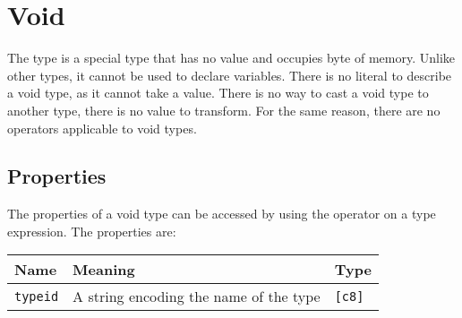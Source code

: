 \section{Void}
\label{sec:org409c2d8}

The  type is a special type that has no value and occupies
 byte of memory. Unlike other types, it cannot be used to declare
variables. There is no literal to describe a void type, as it cannot take a
value. There is no way to cast a void type to another type, there is no value to
transform. For the same reason, there are no operators applicable to void types.

\subsection{Properties}
\label{sec:orgffa98ee}

The properties of a void type can be accessed by using the \token{::} operator
on a type expression. The properties are:

\begin{center}
  \begin{adjustbox}{max width=\linewidth}
    \begin{tabular}{|l|ll|}
      \hline
      Name & Meaning & Type\\[0pt]
      \hline
      \hline
      \texttt{typeid} & A string encoding the name of the type & \texttt{[c8]}\\[0pt]
      \hline
    \end{tabular}
  \end{adjustbox}
\end{center}
